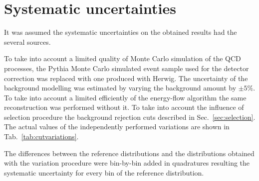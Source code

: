 








































\FloatBarrier
\section{Systematic uncertainties}
\label{sec:systematic}
It was assumed the
 systematic uncertainties on the obtained results 
 had the several sources.

 To take into account a limited quality of Monte Carlo simulation of the
 QCD processes, the Pythia Monte Carlo simulated event sample used for the detector
 correction was replaced with one produced with Herwig.
 The uncertainty of the background modelling was estimated by varying the 
 background amount by $\pm5\%$.
To take into account a limited efficiently of the energy-flow 
algorithm the same reconstruction was performed without it.
 To take into account the influence of selection procedure
the background rejection cuts described in Sec.~\ref{sec:selection}. %
 The actual values of the independently performed variations are shown in Tab.~\ref{tab:cutvariations}.
 \TABcutvariations
 
The differences between the reference distributions and the distributions obtained with 
the variation procedure were bin-by-bin added in quadratures resulting the systematic uncertainty for 
every bin of the reference distribution.
 


